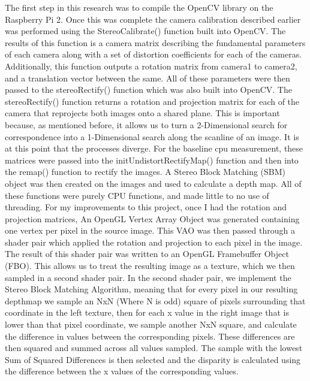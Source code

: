 The first step in this research was to compile the OpenCV library on the Raspberry Pi 2.  Once this was complete the camera calibration described earlier was performed using the StereoCalibrate() function built into OpenCV.  The results of this function is a camera matrix describing the fundamental parameters of each camera along with a set of distortion coefficients for each of the cameras.  Additionally, this function outputs a rotation matrix from camera1 to camera2, and a translation vector between the same.  All of these parameters were then passed to the stereoRectify() function which was also built into OpenCV.  The stereoRectify() function returns a rotation and projection matrix for each of the camera that reprojects both images onto a shared plane.  This is important because, as mentioned before, it allows us to turn a 2-Dimensional search for correspondence into a 1-Dimensional search along the scanline of an image.  It is at this point that the processes diverge.  For the baseline cpu measurement, these matrices were passed into the initUndistortRectifyMap() function and then into the remap() function to rectify the images.  A Stereo Block Matching (SBM) object was then created on the images and used to calculate a depth map.  All of these functions were purely CPU functions, and made little to no use of threading.  For my improvements to this project, once I had the rotation and projection matrices, An OpenGL Vertex Array Object was generated containing one vertex per pixel in the source image.  This VAO was then passed through a shader pair which applied the rotation and projection to each pixel in the image.  The result of this shader pair was written to an OpenGL Framebuffer Object (FBO).  This allows us to treat the resulting image as a texture, which we then sampled in a second shader pair.  In the second shader pair, we implement the Stereo Block Matching Algorithm, meaning that for every pixel in our resulting depthmap we sample an NxN (Where N is odd) square of pixels surrounding that coordinate in the left texture, then for each x value in the right image that is lower than that pixel coordinate, we sample another NxN square, and calculate the difference in values between the corresponding pixels.  These differences are then squared and summed across all values sampled.  The sample with the lowest Sum of Squared Differences is then selected and the disparity is calculated using the difference between the x values of the corresponding values.